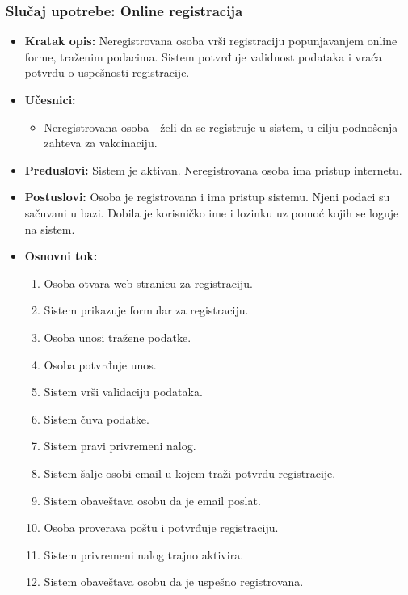 \documentclass[titlepage]{article}
\begin{document}
\subsubsection{Slučaj upotrebe: Online registracija}
\begin{itemize}
    \item \textbf{Kratak opis:} Neregistrovana osoba vrši registraciju popunjavanjem online forme, traženim podacima. Sistem potvrđuje validnost podataka i vraća potvrdu o uspešnosti registracije.
    \item \textbf{Učesnici:}
        \begin{itemize}
            \item Neregistrovana osoba - želi da se registruje u sistem, u cilju podnošenja zahteva za vakcinaciju.
        \end{itemize}
    \item \textbf{Preduslovi:} Sistem je aktivan. Neregistrovana osoba ima pristup internetu.
    \item \textbf{Postuslovi:} Osoba je registrovana i ima pristup sistemu. Njeni podaci su sačuvani u bazi. Dobila je korisničko ime i lozinku uz pomoć kojih se loguje na sistem.
    \item \textbf{Osnovni tok:}
        \begin{enumerate}
            \item Osoba otvara web-stranicu za registraciju.
	    \item Sistem prikazuje formular za registraciju.
	    \item Osoba unosi tražene podatke.
	    \item Osoba potvrđuje unos.
	    \item Sistem vrši validaciju podataka.
	    \item Sistem čuva podatke.
	    \item Sistem pravi privremeni nalog.
	    \item Sistem šalje osobi email u kojem traži potvrdu registracije.
	    \item Sistem obaveštava osobu da je email poslat.
	    \item Osoba proverava poštu i potvrđuje registraciju.
	    \item Sistem privremeni nalog trajno aktivira.
            \item Sistem obaveštava osobu da je uspešno registrovana.
	\end{enumerate}
     
    

\end{itemize}
\end{document}

